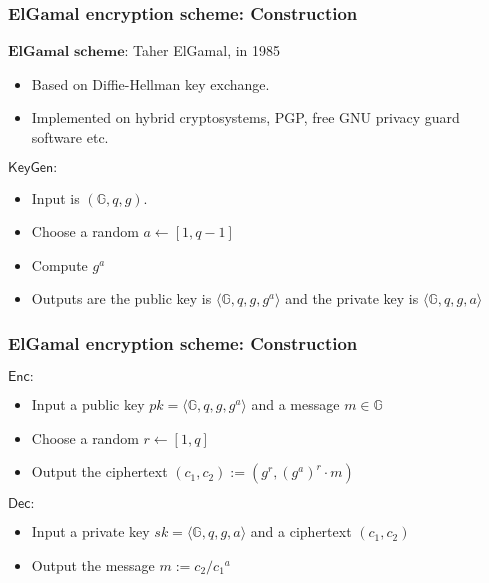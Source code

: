 \documentclass{beamer}
\begin{document}
\begin{frame}[t]
\frametitle{ElGamal encryption scheme: Construction}
$\textbf{ElGamal scheme:}$  Taher ElGamal, in 1985
\vspace*{2mm}
\begin{itemize}
\item  Based on Diffie-Hellman key exchange.
\vspace*{2mm}
\item Implemented on hybrid cryptosystems, PGP, free GNU privacy guard software etc.
\end{itemize}
\vspace*{2mm}
\begin{block}{$\mathsf{KeyGen:}$}
\begin{itemize}
\item Input is $(\mathbb{G},q,g)$. 
\item Choose a random $a\longleftarrow [1,q-1]$ 
\item Compute $g^a$\item Outputs are the public key is $\langle\mathbb{G},q,g,g^a\rangle$ and the private key is $\langle\mathbb{G},q,g,a\rangle$
\end{itemize} 
\end{block}
\end{frame}
\begin{frame}[t]
\frametitle{ElGamal encryption scheme: Construction}

\begin{block}{$\mathsf{Enc:}$}
\begin{itemize}
\item Input a public key $pk=\langle\mathbb{G},q,g,g^a\rangle$ and a message $m \in \mathbb{G}$
\item Choose a random $r \longleftarrow [1,q]$
\item Output the ciphertext $(c_1,c_2):=(g^r,(g^a)^r \cdot m)$\\
\end{itemize} 
\end{block}
\vspace*{5mm}
\begin{block}{$\mathsf{Dec:}$}
\begin{itemize}
\item Input a private key $sk=\langle\mathbb{G},q,g,a \rangle$ and a ciphertext $(c_1,c_2)$
\item Output the message $m:=c_2/{c_1}^a$
\end{itemize} 
\end{block}
\end{frame}
\end{document}
